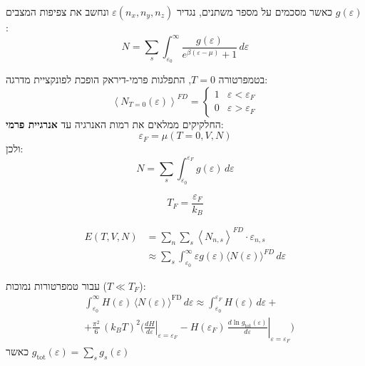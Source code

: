 \begin{cheatformula}
כאשר מסכמים על מספר משתנים, נגדיר $\varepsilon(n_x,n_y,n_z)$ ונחשב את צפיפות המצבים $g(\varepsilon)$:
$$N = \sum_s \int_{\varepsilon_0}^\infty \frac{g(\varepsilon)}{e^{\beta(\varepsilon - \mu)} + 1} \, d\varepsilon$$
\end{cheatformula}



\begin{cheatformula}
בטמפרטורה $T=0$, התפלגות פרמי-דיראק הופכת לפונקציית מדרגה:
$$\left< N_{T=0}(\varepsilon) \right>^{FD} = \begin{cases}
    1 & \varepsilon < \varepsilon_F \\
    0 & \varepsilon > \varepsilon_F
\end{cases}$$
החלקיקים ממלאים את רמות האנרגיה עד \textbf{אנרגיית פרמי}:
$$\varepsilon_F = \mu \left(T=0, V,N\right)$$
ולכן:
$$N = \sum_s \int_{\varepsilon_0}^{\varepsilon_F} g(\varepsilon) \, d\varepsilon$$
\end{cheatformula}

\begin{cheatformula}
$$T_F = \frac{\varepsilon_F}{k_B}$$
\end{cheatformula}



\begin{cheatformula}
\begin{align*} 
E \left(T,V,N\right) &= \sum_n \sum_s \left< N_{n,s} \right>^{FD} \cdot \varepsilon_{n,s} \\
    &\approx \sum_s \int_{\varepsilon_0}^{\infty} \varepsilon g\left(\varepsilon\right) \langle N(\varepsilon) \rangle^{FD} \, d\varepsilon
\end{align*}
\end{cheatformula}

\begin{cheatformula}
עבור טמפרטורות נמוכות ($T \ll T_F$):
\begin{align*}
&\int_{\varepsilon_0}^{\infty} H(\varepsilon)\,\bigl\langle N(\varepsilon)\bigr\rangle^{\mathrm{FD}}\,d\varepsilon
\approx \int_{\varepsilon_0}^{\varepsilon_F} H(\varepsilon)\,d\varepsilon + \\[6pt]
&+ \frac{\pi^2}{6}\,(k_B T)^2
\Biggl(
\left.\frac{dH}{d\varepsilon}\right|_{\varepsilon=\varepsilon_F}
- H(\varepsilon_F)\,
\left.\frac{d\ln g_{\mathrm{tot}}(\varepsilon)}{d\varepsilon}\right|_{\varepsilon=\varepsilon_F}
\Biggr)
\end{align*}
כאשר $g_{\mathrm{tot}}\left(\varepsilon\right) = \sum_s g_s\left(\varepsilon\right)$
\end{cheatformula}



